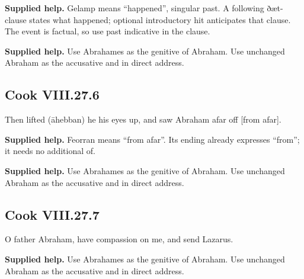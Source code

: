 \textbf{Supplied help.} Gelamp means “happened”, singular past. A following ðæt-clause states what happened; optional introductory hit anticipates that clause. The event is factual, so use past indicative in the clause.

\textbf{Supplied help.} Use Abrahames as the genitive of Abraham. Use unchanged Abraham as the accusative and in direct address.

\par\begin{minipage}{\linewidth}\raggedright
\subsection*{Cook VIII.27.6}

Then lifted (āhebban) he his eyes up, and saw Abraham afar off [from afar].

\end{minipage}\par\addvspace{4pt}

\textbf{Supplied help.} Feorran means “from afar”. Its ending already expresses “from”; it needs no additional of.

\textbf{Supplied help.} Use Abrahames as the genitive of Abraham. Use unchanged Abraham as the accusative and in direct address.

\par\begin{minipage}{\linewidth}\raggedright
\subsection*{Cook VIII.27.7}

O father Abraham, have compassion on me, and send Lazarus.

\textbf{Supplied help.} Use Abrahames as the genitive of Abraham. Use unchanged Abraham as the accusative and in direct address.

\end{minipage}\par\addvspace{4pt}

